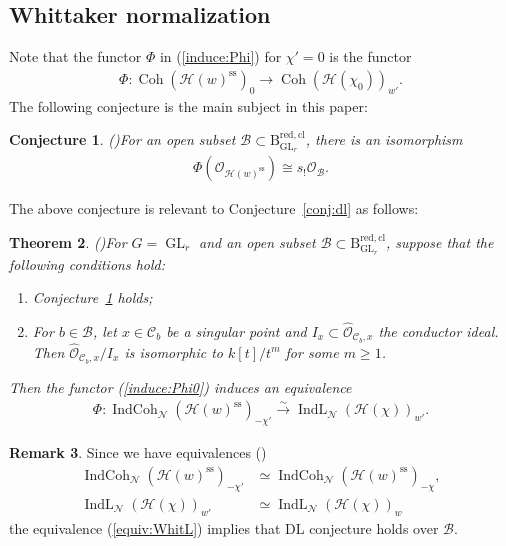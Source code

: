 \documentclass[11pt,oneside,a4paper,mathscr]{amsart}
\newtheorem{thm}{Theorem}[section]
\newtheorem{conj}[thm]{Conjecture}
\theoremstyle{definition}
\newtheorem{remark}[thm]{Remark}
\renewcommand{\geq}{\geqslant}
\newcommand{\cH}{\mathcal{H}}
\newcommand{\cB}{\mathcal{B}}
\newcommand{\cC}{\mathcal{C}}
\newcommand{\cO}{\mathcal{O}}
\newcommand{\rB}{\mathrm{B}}
\newcommand{\Coh}{\operatorname{Coh}}
\newcommand{\IndCoh}{\operatorname{IndCoh}}
\newcommand{\IndL}{\operatorname{IndL}}
\newcommand{\GL}{\operatorname{GL}}
\begin{document}
\subsection{Whittaker normalization}\label{subsec:whit}
Note that the functor $\Phi$ in (\ref{induce:Phi}) for $\chi'=0$ 
is the functor 
\begin{align*}
    \Phi \colon \Coh(\cH(w)^{\mathrm{ss}})_0 \to \Coh(\cH(\chi_0))_{w'}.
\end{align*}
The following conjecture is the main subject in this paper: 
\begin{conj}\emph{(\cite[Conjecture~4.4]{TodaGL2})}\label{conj:Whit}
    For an open subset $\cB \subset \rB_{\GL_r}^{\mathrm{red, cl}}$, there is an isomorphism 
    \begin{align*}
        \Phi(\mathcal{O}_{\cH(w)^{\mathrm{ss}}}) \cong s_{!}\mathcal{O}_{\cB}.
    \end{align*}
\end{conj}

The above conjecture is relevant to Conjecture~\ref{conj:dl}
as follows: 
\begin{thm}\emph{(\cite[Theorem~4.29]{TodaGL2})}\label{thm:WhitGL}
For $G=\GL_r$ and an open subset $\cB \subset \rB_{\GL_r}^{\mathrm{red, cl}}$, 
suppose that the following conditions hold: 
\begin{enumerate}
    \item Conjecture~\ref{conj:Whit} holds;
    \item For $b\in \cB$, let $x\in \cC_b$ be a singular point and $I_x \subset \widehat{\cO}_{\cC_b, x}$
    the conductor ideal. Then $\widehat{\cO}_{\cC_b, x}/I_x$ is isomorphic to $k[t]/t^m$ for some $m\geq 1$.
\end{enumerate}
Then the functor (\ref{induce:Phi0}) induces an equivalence
\begin{align}\label{equiv:WhitL}
    \Phi \colon \IndCoh_{\mathcal{N}}(\cH(w)^{\mathrm{ss}})_{-\chi'} \stackrel{\sim}{\to} \IndL_{\mathcal{N}}(\cH(\chi))_{w'}.
\end{align}
\end{thm}

\begin{remark}\label{rmk:thm1}
Since we have equivalences (\cite[Remark~2.14]{TodaGL2})
\begin{align*}
 \IndCoh_{\mathcal{N}}(\cH(w)^{\mathrm{ss}})_{-\chi'} &\simeq
    \IndCoh_{\mathcal{N}}(\cH(w)^{\mathrm{ss}})_{-\chi}, \\
 \IndL_{\mathcal{N}}(\cH(\chi))_{w'} &\simeq \IndL_{\mathcal{N}}(\cH(\chi))_{w}
\end{align*}
the equivalence (\ref{equiv:WhitL}) implies that DL conjecture holds over $\cB$. 
\end{remark}
\end{document}
